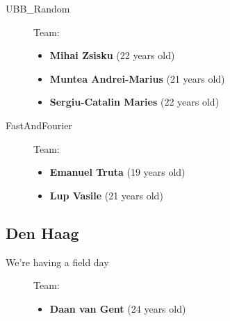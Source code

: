 \documentclass[a4paper,11pt]{article}
\begin{document}
\begin{description}
  \item[UBB\_Random]
    Team:
    \begin{itemize}
      \item \textbf{Mihai Zsisku} (22 years old)
      \item \textbf{Muntea Andrei-Marius} (21 years old)
      \item \textbf{Sergiu-Catalin Maries} (22 years old)
    \end{itemize}
  \item[FastAndFourier]
    Team:
    \begin{itemize}
      \item \textbf{Emanuel Truta} (19 years old)
      \item \textbf{Lup Vasile} (21 years old)
    \end{itemize}
\end{description}

\subsection{Den Haag}

\begin{description}
  \item[We're having a field day]
    Team:
    \begin{itemize}
      \item \textbf{Daan van Gent} (24 years old)
    \end{itemize}
\end{description}
\end{document}

